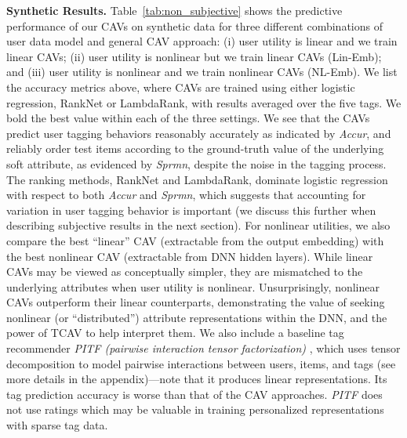 \documentclass[manuscript,screen,nonacm]{acmart}
\newcommand{\1}{{\mathbf 1}}
\theoremstyle{TheoremNum}
\begin{document}
\vskip 2mm
\noindent
\textbf{Synthetic Results.} \hspace*{2mm}
Table~\ref{tab:non_subjective} shows the predictive performance of our CAVs on synthetic data for three 
different combinations of user data model and general CAV approach: (i) user utility is linear and we train linear CAVs; (ii) user utility is nonlinear but we train linear CAVs (Lin-Emb); and (iii) user utility is nonlinear and we train nonlinear CAVs (NL-Emb).
We list the accuracy metrics above, where CAVs are trained using either logistic regression, RankNet or LambdaRank, 
with results averaged over the five tags. We bold the best value within each of the three settings.
We see that the CAVs predict user tagging behaviors reasonably accurately as indicated by \emph{Accur}, and reliably order test items according to the ground-truth value of the underlying soft attribute, as evidenced by \emph{Sprmn}, despite the noise in the tagging process.
The ranking methods, RankNet and LambdaRank, dominate logistic regression with respect to both \emph{Accur} and \emph{Sprmn}, which suggests that accounting for variation in user tagging behavior is important (we discuss this further when describing subjective results in the next section).
For nonlinear utilities, we also compare the best ``linear'' CAV (extractable from the output embedding) with the best nonlinear CAV (extractable from DNN hidden layers). While linear CAVs may be viewed as conceptually simpler, they are mismatched to the underlying attributes when user utility is nonlinear. Unsurprisingly, nonlinear CAVs outperform their linear counterparts, demonstrating the value of seeking nonlinear (or ``distributed'') attribute representations within the DNN, and the power of TCAV to help interpret them. We also include a baseline tag recommender \emph{PITF (pairwise interaction tensor factorization)} \cite{rendle2010}, which uses tensor decomposition to model pairwise interactions between users, items, and tags (see more details in the appendix)---note that it produces linear representations. Its tag prediction accuracy is worse than that of the CAV approaches. \emph{PITF} does not use ratings which may be valuable in training personalized representations with sparse tag data. 
\end{document}
